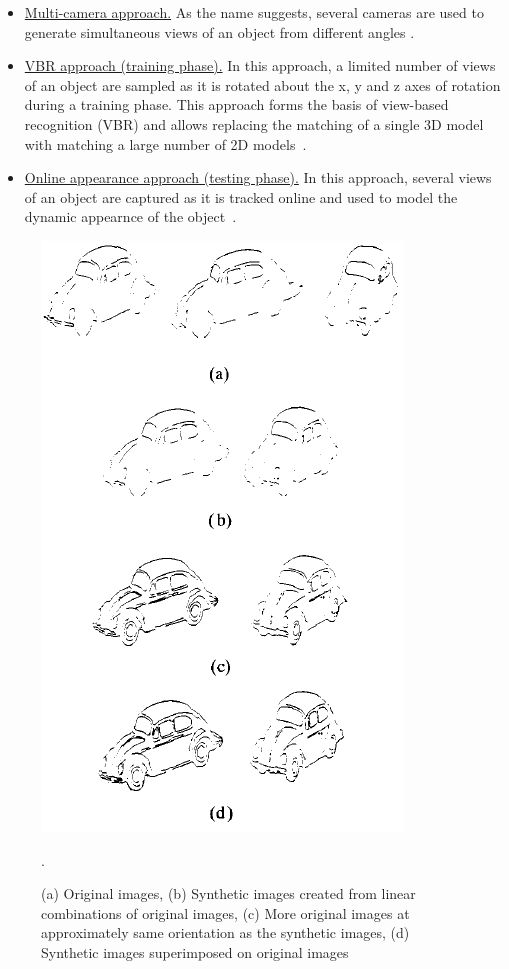 \begin{Body}
\begin{itemize}
\item \underline{Multi-camera approach.}  As the name suggests, several cameras are used to generate simultaneous views of an object from different angles \cite{2000_JNL_EasyLiv_Krumm}.  
\item \underline{VBR approach (training phase).}  In this approach, a limited number of views of an object are sampled as it is rotated about the x, y and z axes of rotation during a training phase.  This approach forms the basis of view-based recognition (VBR) and allows replacing the matching of a single 3D model with matching a large number of 2D models~\cite{1992_JNL_VBR_Breuel, 1993_CNF_Gestures_Darrell}.
\item \underline{Online appearance approach (testing phase).}  In this approach, several views of an object are captured as it is tracked online and used to model the dynamic appearnce of the object~\cite{2008_JNL_subspaceTRK_Ross}.
\end{itemize}
								\begin{figure}[t]
								\center
								\includegraphics[height=0.6\textheight]{thesis/1991_JNL_TRKsub_Ullman_fig3.png}
								\caption{(a) Original images, (b) Synthetic images created from linear combinations of original images, (c) More original images at approximately same orientation as the synthetic images, (d) Synthetic images superimposed on original images~\cite{1991_JNL_Recog_Ullman}}.
								\label{fig:1991_JNL_TRKsub_Ullman_fig3}
								\end{figure}


\end{Body}
